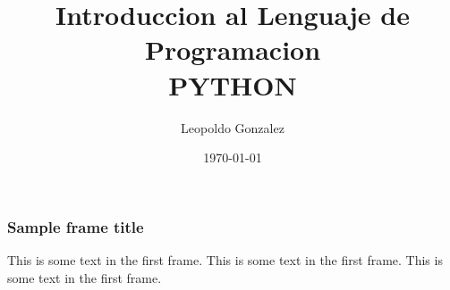 \documentclass{beamer}
\title{Introduccion al Lenguaje de Programacion \\ PYTHON}
\author{Leopoldo Gonzalez}
\institute{Instituto de Neurobiologia \\ \textbf{UNAM}}
\date{\today}
\begin{document}
\frame{\titlepage}

\begin{frame}
\frametitle{Sample frame title}
This is some text in the first frame. This is some text in the first frame. This is some text in the first frame.
\end{frame}

%


%
\end{document}
